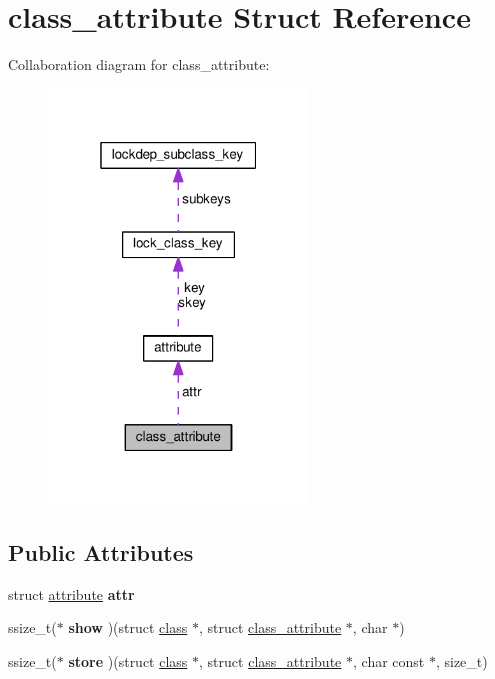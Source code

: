\hypertarget{structclass__attribute}{}\section{class\+\_\+attribute Struct Reference}
\label{structclass__attribute}


Collaboration diagram for class\+\_\+attribute\+:
\nopagebreak
\begin{figure}[H]
\begin{center}
\leavevmode
\includegraphics[width=196pt]{structclass__attribute__coll__graph}
\end{center}
\end{figure}
\subsection*{Public Attributes}
\begin{DoxyCompactItemize}
\item 
\hypertarget{structclass__attribute_a57e9268bfcbcfd1e950afdce5badd327}{}struct \hyperlink{structattribute}{attribute} {\bfseries attr}\label{structclass__attribute_a57e9268bfcbcfd1e950afdce5badd327}

\item 
\hypertarget{structclass__attribute_adcb855afca6c04fd16ef0ca3d3d2ef32}{}ssize\+\_\+t($\ast$ {\bfseries show} )(struct \hyperlink{structclass}{class} $\ast$, struct \hyperlink{structclass__attribute}{class\+\_\+attribute} $\ast$, char $\ast$)\label{structclass__attribute_adcb855afca6c04fd16ef0ca3d3d2ef32}

\item 
\hypertarget{structclass__attribute_a6cab8c2d08b3ec8f53a4320a70a9f098}{}ssize\+\_\+t($\ast$ {\bfseries store} )(struct \hyperlink{structclass}{class} $\ast$, struct \hyperlink{structclass__attribute}{class\+\_\+attribute} $\ast$, char const $\ast$, size\+\_\+t)\label{structclass__attribute_a6cab8c2d08b3ec8f53a4320a70a9f098}

\end{DoxyCompactItemize}


